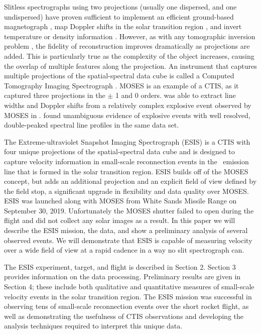 \documentclass[linenumbers,trackchanges]{aastex63}
\begin{document}
    Slitless spectrographs using two projections (usually one dispersed, and one undispersed) have proven sufficient to implement an efficient ground-based magnetograph \citep{DeforestStereoscopy2004}, map Doppler shifts in the solar transition region \citep{Courrier2018}, and invert temperature or density information \citep{winebarger2019}. 
    However, as with any tomographic inversion problem \citep[e.g.,][]{KakSlaney2001}, the fidelity of reconstruction improves dramatically as projections are added. 
    This is particularly true as the complexity of the object increases, causing the overlap of multiple features along the projection. 
    An instrument that captures multiple projections of the spatial-spectral data cube is called a Computed Tomography Imaging Spectrograph  \cite[CTIS,][]{DescourDereniakCTIS1995}.  
    MOSES is an example of a CTIS, as it captured three projections in the $\pm$ 1 and 0 orders.  
    \cite{Fox2010} was able to extract line widths and Doppler shifts from a relatively complex explosive event observed by MOSES in \heii.  
    \cite{Rust2019} found unambiguous evidence of explosive events with well resolved, double-peaked spectral line profiles in the same data set.
    
    The Extreme-ultraviolet Snapshot Imaging Spectrograph (ESIS) is a CTIS with four unique projections of the spatial-spectral data cube and is designed to capture velocity information in small-scale reconnection events in the \ov \ emission line that is formed in the solar transition region. 
    ESIS builds off of the MOSES concept, but adds an additional projection and an explicit field of view defined by the field stop, a significant upgrade in flexibility and data quality over MOSES.
    ESIS was launched along with MOSES from White Sands Missile Range on September 30,  2019.
    Unfortunately the MOSES shutter failed to open during the flight and did not collect any solar images as a result.
    In this paper we will describe the ESIS mission, the data, and show a preliminary analysis of several observed events.
    We will demonstrate that ESIS is capable of measuring velocity over a wide field of view at a rapid cadence in a way no slit spectrograph can.
    
    The ESIS experiment, target, and flight is described in Section 2.  
    Section 3 provides information on the data processing.  
    Preliminary results are given in Section 4; these include both qualitative and quantitative measures of small-scale velocity events in the solar transition region.  
    The ESIS mission was successful in  observing tens of small-scale reconnection events over the short rocket flight, as well as demonstrating the usefulness of CTIS observations and developing the analysis techniques required to interpret this unique data.
\end{document}
